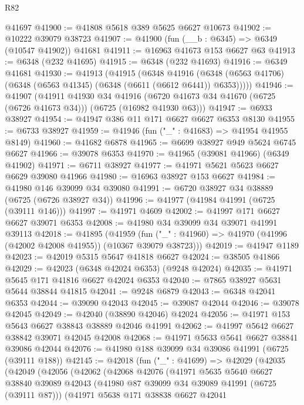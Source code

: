 \begin{lexlean}{R82}
\begin{coremodule}
    @41697
@41900 := @41808 @5618 @389 @5625 @6627 @10673
@41902 := @10222 @39079 @38723
@41907 := @41900 (fun (__b : @6345) => @6349 (@10547 @41902)) @41681
@41911 := @16963 @41673 @153 @6627 @63
@41913 := @6348 (@232 @41695)
@41915 := @6348 (@232 @41693)
@41916 := @6349 @41681
@41930 := @41913
    (@41915
      (@6348
        @41916
        (@6348 (@6563 @41706) (@6348 (@6563 @41345) (@6348 (@6611 (@6612 @6441)) @6353)))))
@41946 := @41907
    (@41911
      @41930
      @34
      @41916
      (@6720 @41673 @34 @41670 (@6725 (@6726 @41673 @34)))
      (@6725 (@16982 @41930 @63)))
@41947 := @6933 @38927
@41954 := @41947 @386 @11 @171 @6627 @6627 @6353 @8130
@41955 := @6733 @38927
@41959 := @41946 (fun ("_" : @41683) => @41954 @41955 @8149)
@41960 := @41682 @6878
@41965 := @6699 @38927 @949 @5624 @6745 @6627
@41966 := @39078 @6353
@41970 := @41965 (@39081 @41966) (@6349 @41902)
@41971 := @6711 @38927
@41977 := @41971 @5621 @5623 @6627 @6629 @39080 @41966
@41980 := @16963 @38927 @153 @6627
@41984 := @41980 @146 @39099 @34 @39080
@41991 := @6720 @38927 @34 @38889 (@6725 (@6726 @38927 @34))
@41996 := @41977 (@41984 @41991 (@6725 (@39111 @146)))
@41997 := @41971 @4609
@42002 := @41997 @171 @6627 @6627 @39071 @6353
@42008 := @41980 @34 @39099 @34 @39071 @41991 @39113
@42018 := @41895
    (@41959 (fun ("_" : @41960) => @41970 (@41996 (@42002 @42008 @41955)) (@10367 @39079 @38723)))
@42019 := @41947 @1189
@42023 := @42019 @5315 @5647 @41818 @6627
@42024 := @38505 @41866
@42029 := @42023 (@6348 @42024 @6353) (@9248 @42024)
@42035 := @41971 @5645 @171 @41816 @6627 @42024 @6353
@42040 := @7865 @38927 @5631 @5644 @38844 @41815
@42041 := @9248 @6879
@42043 := @6348 @42041 @6353
@42044 := @39090 @42043
@42045 := @39087 @42044
@42046 := @39078 @42045
@42049 := @42040 (@38890 @42046) @42024
@42056 := @41971 @153 @5643 @6627 @38843 @38889 @42046 @41991
@42062 := @41997 @5642 @6627 @38842 @39071 @42045 @42008
@42068 := @41971 @5633 @5641 @6627 @38841 @39086 @42044
@42076 := @41980 @188 @39099 @34 @39086 @41991 (@6725 (@39111 @188))
@42145 := @42018
    (fun ("_" : @41699) =>
    @42029
      (@42035
        (@42049
          (@42056
            (@42062
              (@42068
                @42076
                (@41971
                  @5635
                  @5640
                  @6627
                  @38840
                  @39089
                  @42043
                  (@41980 @87 @39099 @34 @39089 @41991 (@6725 (@39111 @87)))
                  (@41971
                    @5638
                    @171
                    @38838
                    @6627
                    @42041

\end{coremodule}
\end{lexlean}
